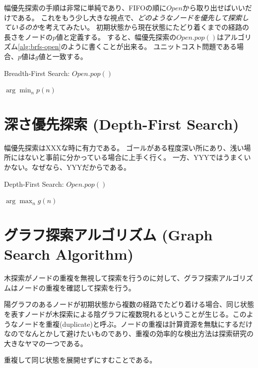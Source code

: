 \documentclass{report}
\begin{document}
幅優先探索の手順は非常に単純であり、FIFOの順に$Open$から取り出せばいいだけである。
これをもう少し大きな視点で、{\it どのようなノードを優先して探索しているのか}を考えてみたい。
初期状態から現在状態にたどり着くまでの経路の長さをノードの$p$値と定義する。
すると、幅優先探索の$Open.pop()$はアルゴリズム\ref{alg:brfs-open}のように書くことが出来る。
ユニットコスト問題である場合、$p$値は$g$値と一致する。

\begin{algorithm}
\caption{Breadth-First Search: $Open.pop()$}
\label{alg:brfs-open}
	\Return $\arg \min_n p(n)$
\end{algorithm}

\section{深さ優先探索 (Depth-First Search)}
\label{sec:depth-first-search}

幅優先探索はXXXな時に有力である。
ゴールがある程度深い所にあり、浅い場所にはないと事前に分かっている場合に上手く行く。
一方、YYYではうまくいかない。なぜなら、YYYだからである。

\begin{algorithm}
\caption{Depth-First Search: $Open.pop()$}
\label{alg:dfs-open}
	\Return $\arg \max_n g(n)$
\end{algorithm}


\section{グラフ探索アルゴリズム (Graph Search Algorithm)}
\label{sec:graph-search-algorithm}

木探索がノードの重複を無視して探索を行うのに対して、グラフ探索アルゴリズムはノードの重複を確認して探索を行う。

陽グラフのあるノードが初期状態から複数の経路でたどり着ける場合、同じ状態を表すノードが木探索による陰グラフに複数現れるということが生じる。このようなノードを重複(duplicate)と呼ぶ。ノードの重複は計算資源を無駄にするだけなのでなんとかして避けたいものであり、重複の効率的な検出方法は探索研究の大きなヤマの一つである。

重複して同じ状態を展開せずにすむことである。


\end{document}
